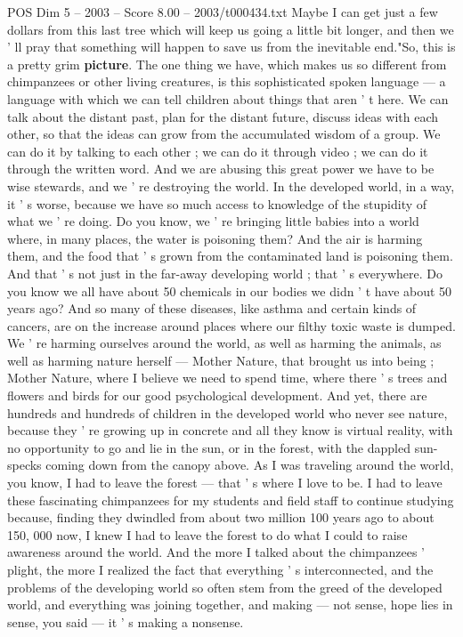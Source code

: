\begin{textsample}{POS Dim 5 – 2003 – Score 8.00 – 2003/t000434.txt}
Maybe I can get just a few dollars from this last tree which will keep us going a little bit longer, and then we ' ll pray that something will happen to save us from the inevitable end."So, this is a pretty grim \textbf{picture}.
The one thing we have, which makes us so different from chimpanzees or other living creatures, is this sophisticated spoken language — a language with which we can tell children about things that aren ' t here.
We can talk about the distant past, plan for the distant future, discuss ideas with each other, so that the ideas can grow from the accumulated wisdom of a group.
We can do it by talking to each other ; we can do it through video ; we can do it through the written word.
And we are abusing this great power we have to be wise stewards, and we ' re destroying the world.
In the developed world, in a way, it ' s worse, because we have so much access to knowledge of the stupidity of what we ' re doing.
Do you know, we ' re bringing little babies into a world where, in many places, the water is poisoning them?
And the air is harming them, and the food that ' s grown from the contaminated land is poisoning them.
And that ' s not just in the far-away developing world ; that ' s everywhere.
Do you know we all have about 50 chemicals in our bodies we didn ' t have about 50 years ago?
And so many of these diseases, like asthma and certain kinds of cancers, are on the increase around places where our filthy toxic waste is dumped.
We ' re harming ourselves around the world, as well as harming the animals, as well as harming nature herself — Mother Nature, that brought us into being ; Mother Nature, where I believe we need to spend time, where there ' s trees and flowers and birds for our good psychological development.
And yet, there are hundreds and hundreds of children in the developed world who never see nature, because they ' re growing up in concrete and all they know is virtual reality, with no opportunity to go and lie in the sun, or in the forest, with the dappled sun-specks coming down from the canopy above.
As I was traveling around the world, you know, I had to leave the forest — that ' s where I love to be.
I had to leave these fascinating chimpanzees for my students and field staff to continue studying because, finding they dwindled from about two million 100 years ago to about 150, 000 now, I knew I had to leave the forest to do what I could to raise awareness around the world.
And the more I talked about the chimpanzees ' plight, the more I realized the fact that everything ' s interconnected, and the problems of the developing world so often stem from the greed of the developed world, and everything was joining together, and making — not sense, hope lies in sense, you said — it ' s making a nonsense.

\end{textsample}
